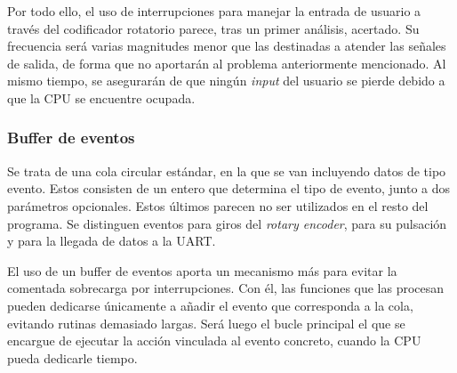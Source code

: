 Por todo ello, el uso de interrupciones para manejar la entrada de usuario a través del codificador rotatorio parece, tras un primer análisis, acertado. Su frecuencia será varias magnitudes menor que las destinadas a atender las señales de salida, de forma que no aportarán al problema anteriormente mencionado. Al mismo tiempo, se asegurarán de que ningún \textit{input} del usuario se pierde debido a que la CPU se encuentre ocupada. \cite{chapman}

\subsubsection{Buffer de eventos} Se trata de una cola circular estándar, en la que se van incluyendo datos de tipo evento. Estos consisten de un entero que determina el tipo de evento, junto a dos parámetros opcionales. Estos últimos parecen no ser utilizados en el resto del programa. Se distinguen eventos para giros del \textit{rotary encoder}, para su pulsación y para la llegada de datos a la UART.

El uso de un buffer de eventos aporta un mecanismo más para evitar la comentada sobrecarga por interrupciones. Con él, las funciones que las procesan pueden dedicarse únicamente a añadir el evento que corresponda a la cola, evitando rutinas demasiado largas. Será luego el bucle principal el que se encargue de ejecutar la acción vinculada al evento concreto, cuando la CPU pueda dedicarle tiempo.




